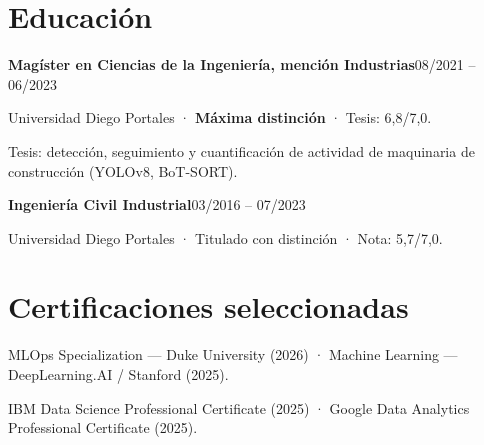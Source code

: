 \documentclass[10pt,a4paper]{article}
\newcommand{\entry}[2]{\par\addvspace{3pt}\textbf{#1}\hfill{\fontsize{9.5}{11}\selectfont\color{muted}#2}\par\nopagebreak}
\begin{document}
\section{Educación}
\entry{Magíster en Ciencias de la Ingeniería, mención Industrias}{08/2021 -- 06/2023}
Universidad Diego Portales · \textbf{Máxima distinción} · Tesis: 6,8/7,0.\par
Tesis: detección, seguimiento y cuantificación de actividad de maquinaria de construcción (YOLOv8, BoT-SORT).\par
\entry{Ingeniería Civil Industrial}{03/2016 -- 07/2023}
Universidad Diego Portales · Titulado con distinción · Nota: 5,7/7,0.

\section{Certificaciones seleccionadas}
MLOps Specialization — Duke University (2026) · Machine Learning — DeepLearning.AI / Stanford (2025).\par
IBM Data Science Professional Certificate (2025) · Google Data Analytics Professional Certificate (2025).
\end{document}
